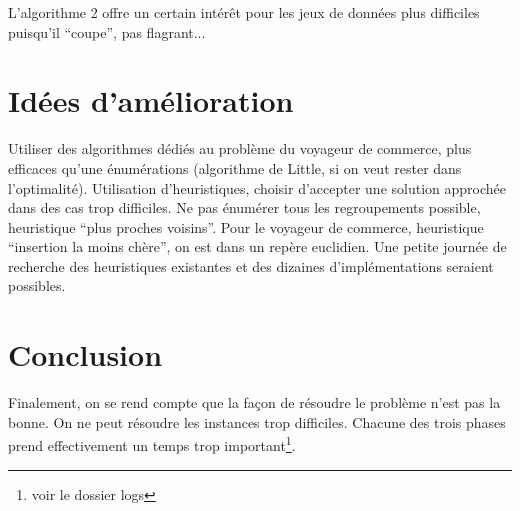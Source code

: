 \documentclass[a4paper,10pt]{article}
\begin{document}
L'algorithme 2 offre un certain intérêt pour les jeux de données plus difficiles puisqu'il ``coupe'', pas flagrant...


\section{Idées d'amélioration}
Utiliser des algorithmes dédiés au problème du voyageur de commerce, plus efficaces qu'une énumérations
(algorithme de Little, si on veut rester dans l'optimalité).
Utilisation d'heuristiques, choisir d'accepter une solution approchée dans des cas trop difficiles.
Ne pas énumérer tous les regroupements possible, heuristique ``plus proches voisins''.
Pour le voyageur de commerce, heuristique ``insertion la moins chère'', on est dans un repère euclidien.
Une petite journée de recherche des heuristiques existantes et des dizaines d'implémentations seraient possibles.

\section{Conclusion}
Finalement, on se rend compte que la façon de résoudre le problème n'est pas la bonne. On ne peut résoudre les instances 
trop difficiles. Chacune des trois phases prend effectivement un temps trop important\footnote{voir le dossier logs}.
\end{document}
